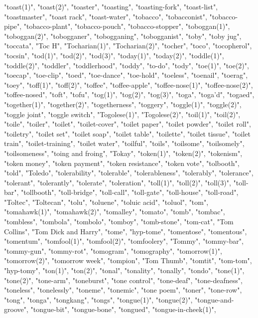 "toast(1)",
"toast(2)",
"toaster",
"toasting",
"toasting-fork",
"toast-list",
"toastmaster",
"toast rack",
"toast-water",
"tobacco",
"tobacconist",
"tobacco-pipe",
"tobacco-plant",
"tobacco-pouch",
"tobacco-stopper",
"toboggan(1)",
"toboggan(2)",
"tobogganer",
"tobogganing",
"tobogganist",
"toby",
"toby jug",
"toccata",
"Toc H",
"Tocharian(1)",
"Tocharian(2)",
"tocher",
"toco",
"tocopherol",
"tocsin",
"tod(1)",
"tod(2)",
"tod(3)",
"today(1)",
"today(2)",
"toddle(1)",
"toddle(2)",
"toddler",
"toddlerhood",
"toddy",
"to-do",
"tody",
"toe(1)",
"toe(2)",
"toecap",
"toe-clip",
"toed",
"toe-dance",
"toe-hold",
"toeless",
"toenail",
"toerag",
"toey",
"toff(1)",
"toff(2)",
"toffee",
"toffee-apple",
"toffee-nose(1)",
"toffee-nose(2)",
"toffee-nosed",
"toft",
"tofu",
"tog(1)",
"tog(2)",
"tog(3)",
"toga",
"toga'd",
"togaed",
"together(1)",
"together(2)",
"togetherness",
"toggery",
"toggle(1)",
"toggle(2)",
"toggle joint",
"toggle switch",
"Togolese(1)",
"Togolese(2)",
"toil(1)",
"toil(2)",
"toile",
"toiler",
"toilet",
"toilet-cover",
"toilet paper",
"toilet powder",
"toilet roll",
"toiletry",
"toilet set",
"toilet soap",
"toilet table",
"toilette",
"toilet tissue",
"toilet train",
"toilet-training",
"toilet water",
"toilful",
"toils",
"toilsome",
"toilsomely",
"toilsomeness",
"toing and froing",
"Tokay",
"token(1)",
"token(2)",
"tokenism",
"token money",
"token payment",
"token resistance",
"token vote",
"tolbooth",
"told",
"Toledo",
"tolerability",
"tolerable",
"tolerableness",
"tolerably",
"tolerance",
"tolerant",
"tolerantly",
"tolerate",
"toleration",
"toll(1)",
"toll(2)",
"toll(3)",
"toll-bar",
"tollbooth",
"toll-bridge",
"toll-call",
"toll-gate",
"toll-house",
"toll-road",
"Toltec",
"Toltecan",
"tolu",
"toluene",
"toluic acid",
"toluol",
"tom",
"tomahawk(1)",
"tomahawk(2)",
"tomalley",
"tomato",
"tomb",
"tombac",
"tombless",
"tombola",
"tombolo",
"tomboy",
"tomb-stone",
"tom-cat",
"Tom Collins",
"Tom Dick and Harry",
"tome",
"hyp-tome",
"tomentose",
"tomentous",
"tomentum",
"tomfool(1)",
"tomfool(2)",
"tomfoolery",
"Tommy",
"tommy-bar",
"tommy-gun",
"tommy-rot",
"tomogram",
"tomography",
"tomorrow(1)",
"tomorrow(2)",
"tomorrow week",
"tompion",
"Tom Thumb",
"tomtit",
"tom-tom",
"hyp-tomy",
"ton(1)",
"ton(2)",
"tonal",
"tonality",
"tonally",
"tondo",
"tone(1)",
"tone(2)",
"tone-arm",
"toneburst",
"tone control",
"tone-deaf",
"tone-deafness",
"toneless",
"tonelessly",
"toneme",
"tonemic",
"tone poem",
"toner",
"tone-row",
"tong",
"tonga",
"tongkang",
"tongs",
"tongue(1)",
"tongue(2)",
"tongue-and-groove",
"tongue-bit",
"tongue-bone",
"tongued",
"tongue-in-cheek(1)",
